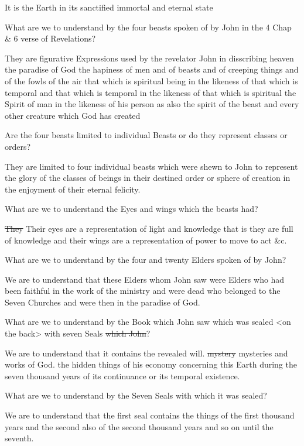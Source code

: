 				\begin{compactitem}
				\item[Ans] It is the Earth in its sanctified immortal and eternal state
				\item[Q] What are we to understand by the four beasts spoken of by John in the 4 Chap \& 6 verse of Revelations?
				\item[A] They are figurative Expressions used by the revelator John in disscribing heaven the paradise of God the hapiness of men and of beasts and of creeping things and of the fowls of the air that which is spiritual being in the likeness of that which is temporal and that which is temporal in the likeness of that which is spiritual the Spirit of man in the likeness of his person as also the spirit of the beast and every other creature which God has created
				\item[Q] Are the four beasts limited to individual Beasts or do they represent classes or orders?
				\item[Ans] They are limited to four individual beasts which were shewn to John to represent the glory of the classes of beings in their destined order or sphere of creation in the enjoyment of their eternal felicity.
				\item[Q] What are we to understand the Eyes and wings which the beasts had?
				\item[A] \sout{They} Their eyes are a representation of light and knowledge that is they are full of knowledge and their wings are a representation of power to move to act \&c.
				\item[Q] What are we to understand by the four and twenty Elders spoken of by John?
				\item[A] We are to understand that these Elders whom John saw were Elders who had been faithful in the work of the ministry and were dead who belonged to the Seven Churches and were then in the paradise of God.
				\item[Q] What are we to understand by the Book which John saw which was sealed <on the back> with seven Seals \sout{which John}?
				\item[Ans.] We are to understand that it contains the revealed will. \sout{mystery} mysteries and works of God. the hidden things of his economy concerning this Earth during the seven thousand years of its continuance or its temporal existence.
				\item[Q] What are we to understand by the Seven Seals with which it was sealed?
				\item[A] We are to understand that the first seal contains the things of the first thousand years and the second also of the second thousand years and so on until the seventh.

\end{compactitem}
